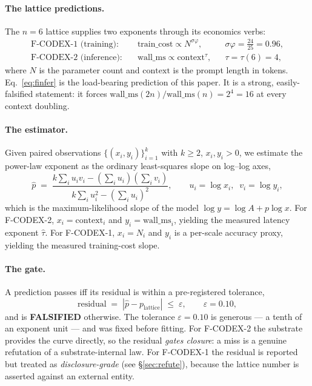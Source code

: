 \documentclass[11pt,a4paper]{article}
\newcommand{\red}[1]{\textcolor{red!70!black}{\textbf{#1}}}
\newcommand{\ctx}{\ensuremath{n}}
\newcommand{\taum}{\ensuremath{\hat{\tau}}}
\begin{document}
\paragraph{The lattice predictions.}
The \(n{=}6\) lattice supplies two exponents through its economics verbs:
\begin{align}
\label{eq:ftrain}
\text{F-CODEX-1 (training):}\quad
  & \text{train\_cost} \propto N^{\sigma\varphi},
    && \sigma\varphi = \frac{24}{25} = 0.96, \\
\label{eq:finfer}
\text{F-CODEX-2 (inference):}\quad
  & \mathrm{wall\_ms} \propto \mathrm{context}^{\tau},
    && \tau = \tau(6) = 4,
\end{align}
where \(N\) is the parameter count and \(\mathrm{context}\) is the prompt length
in tokens. Eq.~\eqref{eq:finfer} is the load-bearing prediction of this paper.
It is a strong, easily-falsified statement: it forces
\(\mathrm{wall\_ms}(2\ctx)/\mathrm{wall\_ms}(\ctx) = 2^4 = 16\) at every context
doubling.

\paragraph{The estimator.}
Given paired observations \(\{(x_i, y_i)\}_{i=1}^{k}\) with \(k \ge 2\),
\(x_i, y_i > 0\), we estimate the power-law exponent as the ordinary
least-squares slope on log--log axes,
\begin{equation}
\label{eq:ols}
\hat{p} \;=\;
\frac{k \sum_i u_i v_i - \left(\sum_i u_i\right)\!\left(\sum_i v_i\right)}
     {k \sum_i u_i^2 - \left(\sum_i u_i\right)^2},
\qquad u_i = \log x_i,\;\; v_i = \log y_i ,
\end{equation}
which is the maximum-likelihood slope of the model \(\log y = \log A + p\log x\).
For F-CODEX-2, \(x_i = \mathrm{context}_i\) and \(y_i = \mathrm{wall\_ms}_i\),
yielding the measured latency exponent \(\taum\). For F-CODEX-1, \(x_i = N_i\)
and \(y_i\) is a per-scale accuracy proxy, yielding the measured training-cost
slope.

\paragraph{The gate.}
A prediction passes iff its residual is within a pre-registered tolerance,
\begin{equation}
\label{eq:gate}
\text{residual} \;=\; |\hat{p} - p_{\text{lattice}}| \;\le\; \varepsilon,
\qquad \varepsilon = 0.10,
\end{equation}
and is \red{FALSIFIED} otherwise. The tolerance \(\varepsilon = 0.10\) is
generous --- a tenth of an exponent unit --- and was fixed before fitting. For
F-CODEX-2 the substrate provides the curve directly, so the residual
\emph{gates closure}: a miss is a genuine refutation of a substrate-internal
law. For F-CODEX-1 the residual is reported but treated as
\emph{disclosure-grade} (see \S\ref{sec:refute}), because the lattice number is
asserted against an external entity.
\end{document}
